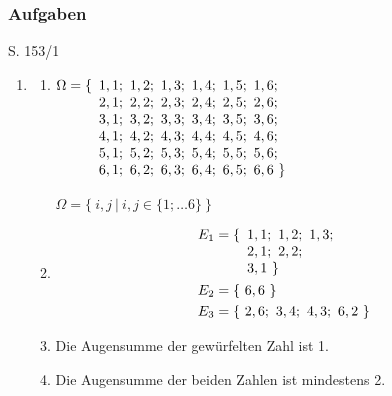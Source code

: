 
\subsubsection{Aufgaben}

\begin{Exercise}{S. 153/1}{}
\begin{enumerate}[leftmargin=*]
    \item [1.]\begin{enumerate}[label=\alph*),leftmargin=*]
        \item[a)] {
            \begin{minipage}[t]{0.55\linewidth}
                $\Omega = \{ \begin{array}[t]{l}
                    1,1; \ 1,2; \ 1,3; \ 1,4; \ 1,5; \ 1,6; \\
                    2,1; \ 2,2; \ 2,3; \ 2,4; \ 2,5; \ 2,6; \\
                    3,1; \ 3,2; \ 3,3; \ 3,4; \ 3,5; \ 3,6; \\
                    4,1; \ 4,2; \ 4,3; \ 4,4; \ 4,5; \ 4,6; \\
                    5,1; \ 5,2; \ 5,3; \ 5,4; \ 5,5; \ 5,6; \\
                    6,1; \ 6,2; \ 6,3; \ 6,4; \ 6,5; \ 6,6 \
                    \}
                \end{array}$
            \end{minipage}
            \begin{minipage}[t]{0.40\linewidth}
                $\Omega = \{ \ i,j \ | \ i,j \in \{1; \dots 6\} \ \}$
            \end{minipage}
            }
        \item [b)] {
            \vspace{-2.0ex}
            \begin{align*}
                E_{1} &= \{ \begin{array}[t]{l}
                    1,1; \ 1,2; \ 1,3; \\
                    2,1; \ 2,2; \\
                    3,1 \
                    \}
                \end{array}\\
                E_{2} &= \{ \ 6,6 \ \}\\
                E_{3} &= \{ \ 2,6; \ 3,4; \ 4,3; \ 6,2 \ \}
            \end{align*} 
            }
        \item [c)] {
            Die Augensumme der gewürfelten Zahl ist 1.
            }
        \item [d)] {
            Die Augensumme der beiden Zahlen ist mindestens 2.
            }
    \end{enumerate}
\end{enumerate}
\end{Exercise}

